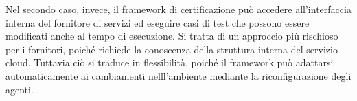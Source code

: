 \documentclass[../main.tex]{subfiles}
\begin{document}
\begin{itemize}
Nel secondo caso, invece, il framework di certificazione può accedere all'interfaccia interna del fornitore di servizi ed eseguire casi di test che possono essere modificati anche al tempo di esecuzione.
Si tratta di un approccio più rischioso per i fornitori, poiché richiede la conoscenza della struttura interna del servizio cloud. Tuttavia ciò si traduce in flessibilità, poiché il framework può adattarsi automaticamente ai cambiamenti nelll'ambiente mediante la riconfigurazione degli agenti.

\end{itemize}




\end{document}
